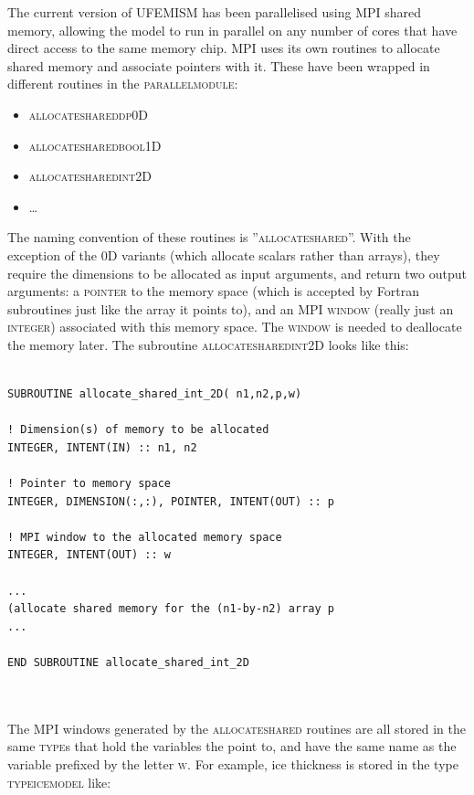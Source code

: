 \documentclass{article}
\begin{document}
The current version of UFEMISM has been parallelised using MPI shared memory, allowing the model to run in parallel on any number of cores that have direct access to the same memory chip. MPI uses its own routines to allocate shared memory and associate pointers with it. These have been wrapped in different routines in the \textsc{parallel\textunderscore module}:

\begin{itemize}
\item \textsc{allocate\textunderscore shared\textunderscore dp\textunderscore 0D}
\item \textsc{allocate\textunderscore shared\textunderscore bool\textunderscore 1D}
\item \textsc{allocate\textunderscore shared\textunderscore int\textunderscore 2D}
\item \ldots
\end{itemize}

The naming convention of these routines is ''\textsc{allocate\textunderscore shared\textunderscore [type]\textunderscore [dim]}''. With the exception of the \textsc{0D} variants (which allocate scalars rather than arrays), they require the dimensions to be allocated as input arguments, and return two output arguments: a \textsc{pointer} to the memory space (which is accepted by Fortran subroutines just like the array it points to), and an MPI \textsc{window} (really just an \textsc{integer}) associated with this memory space. The \textsc{window} is needed to deallocate the memory later. The subroutine \textsc{allocate\textunderscore shared\textunderscore int\textunderscore 2D} looks like this:

\hrulefill
\begin{lstlisting}

SUBROUTINE allocate_shared_int_2D( n1,n2,p,w)

! Dimension(s) of memory to be allocated
INTEGER, INTENT(IN) :: n1, n2

! Pointer to memory space
INTEGER, DIMENSION(:,:), POINTER, INTENT(OUT) :: p

! MPI window to the allocated memory space
INTEGER, INTENT(OUT) :: w

...
(allocate shared memory for the (n1-by-n2) array p
...

END SUBROUTINE allocate_shared_int_2D  

\end{lstlisting}
\hrulefill
\\
\\
The MPI windows generated by the \textsc{allocate\textunderscore shared} routines are all stored in the same \textsc{type}s that hold the variables the point to, and have the same name as the variable prefixed by the letter \textsc{w}. For example, ice thickness is stored in the type \textsc{type\textunderscore ice\textunderscore model} like:
\end{document}
